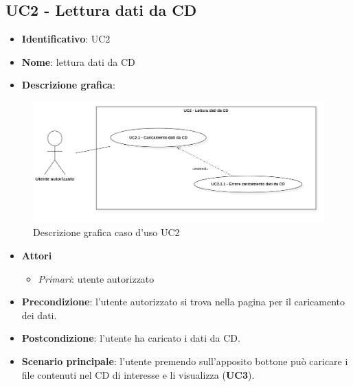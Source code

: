 
\subsection{UC2 - Lettura dati da CD}
\begin{itemize}
  \item \textbf{Identificativo}: UC2
  \item \textbf{Nome}: lettura dati da CD
  \item \textbf{Descrizione grafica}:
\end{itemize}

\begin{figure}[h]
  \centering
  \includegraphics[scale=1.4]{immagini/usecase/UC2.png}
  \caption{Descrizione grafica caso d'uso UC2}
\end{figure}

\begin{itemize}
  \item \textbf{Attori}
        \begin{itemize}
          \item \textit{Primari}: utente autorizzato
        \end{itemize}
  \item \textbf{Precondizione}: l'utente autorizzato si trova nella pagina per il caricamento dei dati.
  \item \textbf{Postcondizione}: l'utente ha caricato i dati da CD.
  \item \textbf{Scenario principale}: l'utente premendo sull'apposito bottone può caricare i file contenuti nel CD di interesse e li visualizza (\textbf{UC3}).
\end{itemize}

